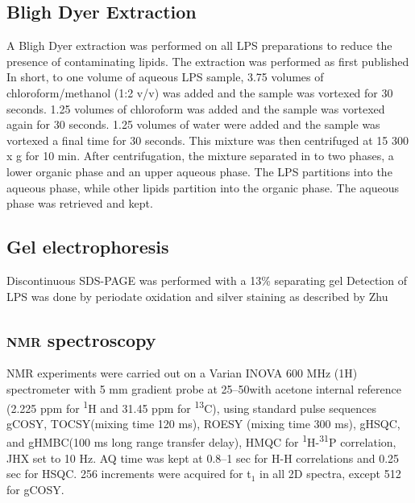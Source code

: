 	\subsection{Bligh Dyer Extraction} %
	\label{sub:bligh_dyer_extraction}
		A Bligh Dyer extraction was performed on all \ac{LPS} preparations to reduce the presence of contaminating lipids. The extraction was performed as first published In short,  to one volume of aqueous \ac{LPS} sample, 3.75 volumes of chloroform/methanol (1:2 v/v) was added and the sample was vortexed for 30 seconds. 1.25 volumes of chloroform was added and the sample was vortexed again for 30 seconds. 1.25 volumes of water were added and the sample was vortexed a final time for 30 seconds. This mixture was then centrifuged at 15 300 x g for 10 min. After centrifugation, the mixture separated in to two phases, a lower organic phase and an upper aqueous phase. The \ac{LPS} partitions into the aqueous phase, while other lipids partition into the organic phase. The aqueous phase was retrieved and kept.

	\subsection{Gel electrophoresis} %
	\label{sub:gel_electrophoresis}

		Discontinuous \ac{SDS-PAGE} was performed with a 13\% separating gel Detection of \ac{LPS} was done by periodate oxidation and silver staining as described by Zhu \etal\!

	\subsection{\textsc{nmr} spectroscopy} %
	\label{sub:nmr_spectroscopy}

		\ac{NMR} experiments were carried out on a Varian INOVA 600 \si{\mega\hertz} (1H) spectrometer with 5 \si{\milli\meter} gradient probe at 25--50\cel with acetone internal reference (2.225 ppm for \textsuperscript{1}H and 31.45 ppm for \textsuperscript{13}C), using standard pulse sequences \ac{gCOSY}, \ac{TOCSY}(mixing time 120 \si{\milli\second}), \ac{ROESY} (mixing time 300 \si{\milli\second}),  \ac{gHSQC}, and \ac{gHMBC}(100 \si{\milli\second} long range transfer delay), \ac{HMQC} for \textsuperscript{1}H-\textsuperscript{31}P correlation, JHX set to 10 \si{\hertz}. AQ time was kept at 0.8--1 sec for H-H correlations and 0.25 sec for \ac{HSQC}. 256 increments were acquired for t$_1$ in all 2D spectra, except 512 for \ac{gCOSY}.

